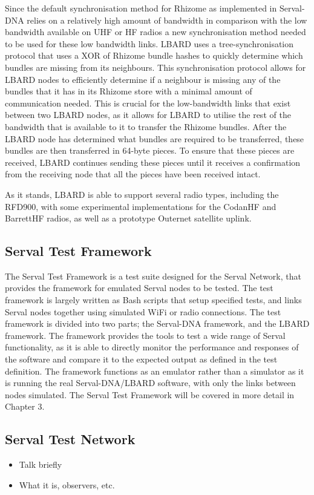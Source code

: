 Since the default synchronisation method for Rhizome as implemented in Serval-DNA relies on a relatively high amount of bandwidth in comparison with the low bandwidth available on UHF or HF radios a new synchronisation method needed to be used for these low bandwidth links.
LBARD uses a tree-synchronisation protocol that uses a XOR of Rhizome bundle hashes to quickly determine which bundles are missing from its neighbours. 
This synchronisation protocol allows for LBARD nodes to efficiently determine if a neighbour is missing any of the bundles that it has in its Rhizome store with a minimal amount of communication needed.
This is crucial for the low-bandwidth links that exist between two LBARD nodes, as it allows for LBARD to utilise the rest of the bandwidth that is available to it to transfer the Rhizome bundles. 
After the LBARD node has determined what bundles are required to be transferred, these bundles are then transferred in 64-byte pieces.
To ensure that these pieces are received, LBARD continues sending these pieces until it receives a confirmation from the receiving node that all the pieces have been received intact.

As it stands, LBARD is able to support several radio types, including the RFD900, with some experimental implementations for the CodanHF and BarrettHF radios, as well as a prototype Outernet satellite uplink.


\subsection{Serval Test Framework}
The Serval Test Framework is a test suite designed for the Serval Network, that provides the framework for emulated Serval nodes to be tested.
The test framework is largely written as Bash scripts that setup specified tests, and links Serval nodes together using simulated WiFi or radio connections.
The test framework is divided into two parts; the Serval-DNA framework, and the LBARD framework.
The framework provides the tools to test a wide range of Serval functionality, as it is able to directly monitor the performance and responses of the software and compare it to the expected output as defined in the test definition.
The framework functions as an emulator rather than a simulator as it is running the real Serval-DNA/LBARD software, with only the links between nodes simulated.
The Serval Test Framework will be covered in more detail in Chapter 3.

\subsection{Serval Test Network}
\begin{itemize}
    \item Talk briefly
    \item What it is, observers, etc.
\end{itemize}

